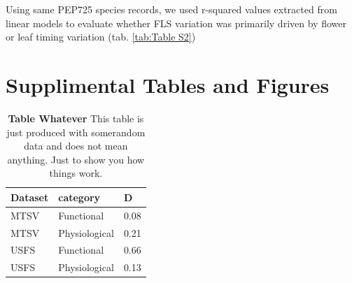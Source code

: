 \documentclass[12pt]{article}\usepackage[]{graphicx}\usepackage[]{color}
\begin{document}
\indent Using same PEP725 species records, we used r-squared values extracted from linear models \citep{baseR} to evaluate whether FLS variation was primarily driven by flower or leaf timing variation (tab. \ref{tab:Table S2})\\


\section*{Supplimental Tables and Figures}
\begin{table}[ht]
\centering
\begin{tabular}{|l|l|l|}
  \hline
Dataset & category & D \\ 
  \hline
MTSV & Functional & 0.08 \\ 
  MTSV & Physiological & 0.21 \\ 
  USFS & Functional & 0.66 \\ 
  USFS & Physiological & 0.13 \\ 
   \hline
\end{tabular}
\caption{\textbf{Table Whatever} This table is just produced with somerandom data and does not mean anything. Just to show you how things work.} 
\label{Test_table}
\end{table}
\end{document}
